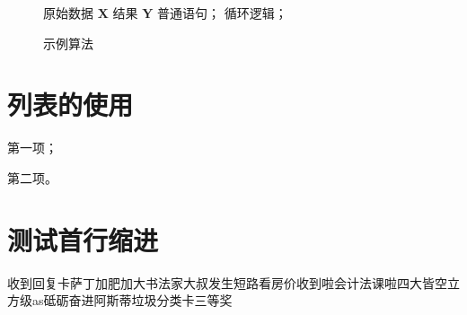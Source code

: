 \begin{figure}
    \centering
    \begin{minipage}{0.75\linewidth}
        \begin{algorithm}[H]
            \caption{示例算法}
            \label{alg-1}
            \begin{algorithmic}[1]
                \Require 原始数据 $\mathbf{X}$
                \Ensure 结果 $\mathbf{Y}$
                \State 普通语句；
                    \State 循环逻辑；
                \EndFor
            \end{algorithmic}
        \end{algorithm}
    \end{minipage}
\end{figure}

\section{列表的使用}

\begin{asparaenum}[(1)]
    \item 第一项；
    \item 第二项。
\end{asparaenum}

\section{测试首行缩进}

收到回复卡萨丁加肥加大书法家大叔发生短路看房价收到啦会计法课啦四大皆空立方级as砥砺奋进阿斯蒂垃圾分类卡三等奖


\let\cleardoublepage\clearpage



